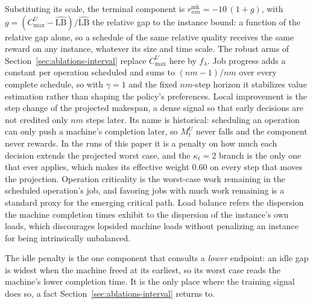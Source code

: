 \documentclass[preprint,12pt]{elsarticle}
\newcommand{\LBi}{\widehat{\mathrm{LB}}}
\theoremstyle{definition}
\theoremstyle{remark}
\begin{document}
Substituting its scale, the terminal component is
$r^{\mathrm{mk}}_{nm}=-10\,(1+g)$, with
$g=(C^{U}_{\max}-\LBi)/\LBi$ the relative gap to the instance bound:
a function of the relative gap alone, so a schedule of the same
relative quality receives the same reward on any instance, whatever
its size and time scale. The robust arms of
Section~\ref{sec:ablations-interval} replace $C^{U}_{\max}$ here by
$f_\lambda$. Job progress adds a constant per operation scheduled and
sums to $(nm-1)/nm$ over every complete schedule, so with $\gamma=1$
and the fixed $nm$-step horizon it stabilizes value estimation rather
than shaping the policy's preferences. Local improvement is the step
change of the projected makespan, a dense signal so that early
decisions are not credited only $nm$ steps later. Its name is
historical: scheduling an operation can only push a machine's
completion later, so $M^{U}_{t}$ never falls and the component never
rewards. In the runs of this paper it is a penalty on how much each
decision extends the projected worst case, and the $\kappa_t{=}2$
branch is the only one that ever applies, which makes its effective
weight $0.60$ on every step that moves the projection. Operation criticality is the worst-case work
remaining in the scheduled operation's job, and favoring jobs with
much work remaining is a standard proxy for the emerging critical
path. Load balance refers the dispersion the machine completion times
exhibit to the dispersion of the instance's own loads, which
discourages lopsided machine loads without penalizing an instance for
being intrinsically unbalanced.

The idle penalty is the one component that consults a \emph{lower}
endpoint: an idle gap is widest when the machine freed at its
earliest, so its worst case reads the machine's lower completion
time. It is the only place where the training signal does so, a fact
Section~\ref{sec:ablations-interval} returns to.
\end{document}
